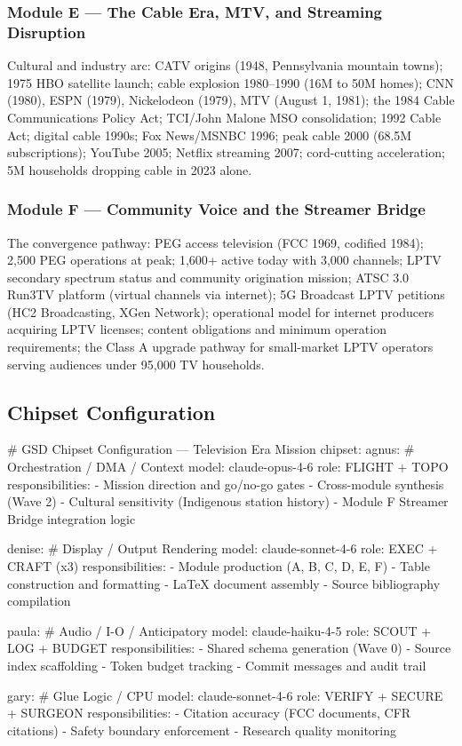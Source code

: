 \documentclass[11pt,letterpaper]{article}
\begin{document}
\subsubsection{Module E --- The Cable Era, MTV, and Streaming Disruption}
Cultural and industry arc: CATV origins (1948, Pennsylvania mountain towns); 1975 HBO satellite launch; cable explosion 1980--1990 (16M to 50M homes); CNN (1980), ESPN (1979), Nickelodeon (1979), MTV (August 1, 1981); the 1984 Cable Communications Policy Act; TCI/John Malone MSO consolidation; 1992 Cable Act; digital cable 1990s; Fox News/MSNBC 1996; peak cable 2000 (68.5M subscriptions); YouTube 2005; Netflix streaming 2007; cord-cutting acceleration; 5M households dropping cable in 2023 alone.

\subsubsection{Module F --- Community Voice and the Streamer Bridge}
The convergence pathway: PEG access television (FCC 1969, codified 1984); 2,500 PEG operations at peak; 1,600+ active today with 3,000 channels; LPTV secondary spectrum status and community origination mission; ATSC 3.0 Run3TV platform (virtual channels via internet); 5G Broadcast LPTV petitions (HC2 Broadcasting, XGen Network); operational model for internet producers acquiring LPTV licenses; content obligations and minimum operation requirements; the Class A upgrade pathway for small-market LPTV operators serving audiences under 95,000 TV households.

\subsection{Chipset Configuration}

\begin{asciibox}
# GSD Chipset Configuration --- Television Era Mission
chipset:
  agnus:                    # Orchestration / DMA / Context
    model: claude-opus-4-6
    role: FLIGHT + TOPO
    responsibilities:
      - Mission direction and go/no-go gates
      - Cross-module synthesis (Wave 2)
      - Cultural sensitivity (Indigenous station history)
      - Module F Streamer Bridge integration logic

  denise:                   # Display / Output Rendering
    model: claude-sonnet-4-6
    role: EXEC + CRAFT (x3)
    responsibilities:
      - Module production (A, B, C, D, E, F)
      - Table construction and formatting
      - LaTeX document assembly
      - Source bibliography compilation

  paula:                    # Audio / I-O / Anticipatory
    model: claude-haiku-4-5
    role: SCOUT + LOG + BUDGET
    responsibilities:
      - Shared schema generation (Wave 0)
      - Source index scaffolding
      - Token budget tracking
      - Commit messages and audit trail

  gary:                     # Glue Logic / CPU
    model: claude-sonnet-4-6
    role: VERIFY + SECURE + SURGEON
    responsibilities:
      - Citation accuracy (FCC documents, CFR citations)
      - Safety boundary enforcement
      - Research quality monitoring
\end{asciibox}
\end{document}
